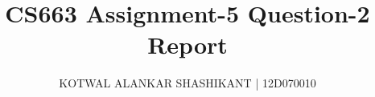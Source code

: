 \documentclass[11pt]{report}
\begin{document}
\title{CS663 Assignment-5 Question-2 Report}
\author{KOTWAL ALANKAR SHASHIKANT | 12D070010}
\maketitle
\end{document}
